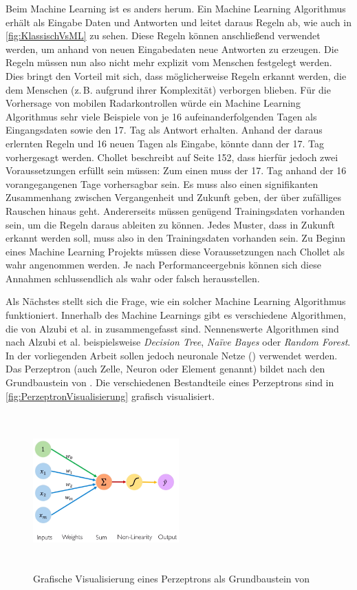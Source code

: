 Beim Machine Learning ist es anders herum.
Ein Machine Learning Algorithmus erhält als Eingabe Daten und Antworten und leitet daraus Regeln ab, wie auch in \autoref{fig:KlassischVsML} zu sehen.
Diese Regeln können anschließend verwendet werden, um anhand von neuen Eingabedaten neue Antworten zu erzeugen.
Die Regeln müssen nun also nicht mehr explizit vom Menschen festgelegt werden.
Dies bringt den Vorteil mit sich, dass möglicherweise Regeln erkannt werden, die dem Menschen (z.\,B. aufgrund ihrer Komplexität) verborgen blieben.
Für die Vorhersage von mobilen Radarkontrollen würde ein Machine Learning Algorithmus sehr viele Beispiele von je 16 aufeinanderfolgenden Tagen als Eingangsdaten sowie den 17. Tag als Antwort erhalten.
Anhand der daraus erlernten Regeln und 16 neuen Tagen als Eingabe, könnte dann der 17. Tag vorhergesagt werden.
Chollet beschreibt auf Seite 152, dass hierfür jedoch zwei Voraussetzungen erfüllt sein müssen:
Zum einen muss der 17. Tag anhand der 16 vorangegangenen Tage vorhersagbar sein.
Es muss also einen signifikanten Zusammenhang zwischen Vergangenheit und Zukunft geben, der über zufälliges Rauschen hinaus geht.
Andererseits müssen genügend Trainingsdaten vorhanden sein, um die Regeln daraus ableiten zu können.
Jedes Muster, dass in Zukunft erkannt werden soll, muss also in den Trainingsdaten vorhanden sein.
Zu Beginn eines Machine Learning Projekts müssen diese Voraussetzungen nach Chollet als wahr angenommen werden.
Je nach Performanceergebnis können sich diese Annahmen schlussendlich als wahr oder falsch herausstellen.

Als Nächstes stellt sich die Frage, wie ein solcher Machine Learning Algorithmus funktioniert.
Innerhalb des Machine Learnings gibt es verschiedene Algorithmen, die von Alzubi et al. in \cite{MachineLearningOverview} zusammengefasst sind.
Nennenswerte Algorithmen sind nach Alzubi et al. beispielsweise \emph{Decision Tree}, \emph{Na\"ive Bayes} oder \emph{Random Forest}.
In der vorliegenden Arbeit sollen jedoch neuronale Netze () verwendet werden.
Das Perzeptron (auch Zelle, Neuron oder Element genannt) bildet nach \cite{6S191Intro} den Grundbaustein von .
Die verschiedenen Bestandteile eines Perzeptrons sind in \autoref{fig:PerzeptronVisualisierung} grafisch visualisiert.

\begin{figure}[h]
    \centering
    \includegraphics[width=0.5\textwidth,height=6cm,keepaspectratio=true]{content/images/PerzeptronVisualisierung.png}
    \caption{Grafische Visualisierung eines Perzeptrons als Grundbaustein von  \cite{6S191Intro}}
    \label{fig:PerzeptronVisualisierung}
\end{figure}

